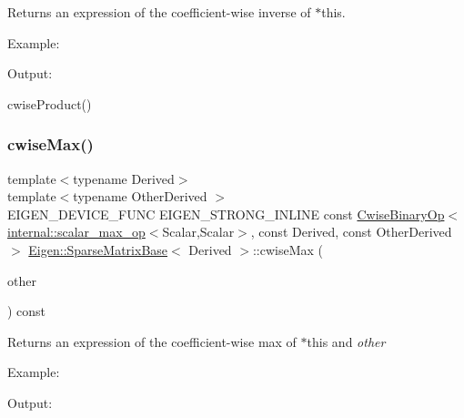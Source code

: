 \begin{DoxyReturn}{Returns}
an expression of the coefficient-\/wise inverse of $\ast$this.
\end{DoxyReturn}
Example\+: 
\begin{DoxyCodeInclude}{0}
\end{DoxyCodeInclude}
 Output\+: 
\begin{DoxyVerbInclude}
\end{DoxyVerbInclude}
 cwise\+Product() \mbox{\label{class_eigen_1_1_sparse_matrix_base_a79030f983f007807e976cc0049164094}} 
\subsubsection{\texorpdfstring{cwiseMax()}{cwiseMax()}\hspace{0.1cm}{\footnotesize\ttfamily [1/2]}}
{\footnotesize\ttfamily template$<$typename Derived$>$ \\
template$<$typename Other\+Derived $>$ \\
E\+I\+G\+E\+N\+\_\+\+D\+E\+V\+I\+C\+E\+\_\+\+F\+U\+NC E\+I\+G\+E\+N\+\_\+\+S\+T\+R\+O\+N\+G\+\_\+\+I\+N\+L\+I\+NE const \mbox{\hyperlink{class_eigen_1_1_cwise_binary_op}{Cwise\+Binary\+Op}}$<$\mbox{\hyperlink{struct_eigen_1_1internal_1_1scalar__max__op}{internal\+::scalar\+\_\+max\+\_\+op}}$<$Scalar,Scalar$>$, const Derived, const Other\+Derived$>$ \mbox{\hyperlink{class_eigen_1_1_sparse_matrix_base}{Eigen\+::\+Sparse\+Matrix\+Base}}$<$ Derived $>$\+::cwise\+Max (\begin{DoxyParamCaption}\item[{const E\+I\+G\+E\+N\+\_\+\+C\+U\+R\+R\+E\+N\+T\+\_\+\+S\+T\+O\+R\+A\+G\+E\+\_\+\+B\+A\+S\+E\+\_\+\+C\+L\+A\+SS$<$ Other\+Derived $>$ \&}]{other }\end{DoxyParamCaption}) const\hspace{0.3cm}{\ttfamily [inline]}}

\begin{DoxyReturn}{Returns}
an expression of the coefficient-\/wise max of $\ast$this and {\itshape other} 
\end{DoxyReturn}
Example\+: 
\begin{DoxyCodeInclude}{0}
\end{DoxyCodeInclude}
 Output\+: 
\begin{DoxyVerbInclude}
\end{DoxyVerbInclude}


